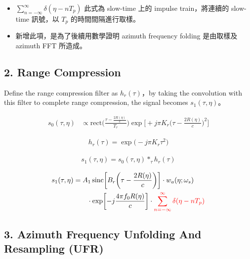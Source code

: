 \documentclass[11pt]{article}
\providecommand{\tightlist}{%
  \setlength{\itemsep}{0pt}\setlength{\parskip}{0pt}}
\begin{document}
\begin{itemize}
\tightlist
\item
  \(\sum_{n=-\infty}^{\infty}\delta(\eta-nT_p)\) 此式為 slow-time 上的
  impulse train，將連續的 slow-time 訊號，以 \(T_p\)
  的時間間隔進行取樣。
\item
  新增此項，是為了後續用數學證明 azimuth frequency folding 是由取樣及
  azimuth FFT 所造成。
\end{itemize}

\hypertarget{range-compression}{%
\subsection{2. Range Compression}\label{range-compression}}

Define the range compression filter as \(h_r(\tau)\)，by taking the convolution with this filter to complete range compression, the signal becomes \(s_1(\tau,\eta)\)。

\begin{equation}
\begin{aligned}
s_0(\tau,\eta)
&\propto
\mathrm{rect}\biggl(\frac{\tau-\frac{2R(\eta)}{c}}{T_r}\biggr)
\exp\biggl[+j\pi K_r\biggl(\tau-\frac{2R(\eta)}{c}\biggr)^2\biggr]
\end{aligned}
\end{equation}

\begin{equation}
\begin{aligned}
h_r(\tau)=\exp\bigl(-j\pi K_r\tau^2\bigr)
\end{aligned}
\end{equation}

\begin{equation}
\begin{aligned}
s_1(\tau,\eta)=s_0(\tau,\eta)*_\tau h_r(\tau)
\end{aligned}
\end{equation}

\begin{equation}
\begin{aligned}
s_1(\tau,\eta)
&=
A_1\,
\mathrm{sinc}\biggl[ B_r\biggl( \tau-\frac{2R(\eta)}{c} \biggr) \biggr]
\cdot w_a(\eta;\omega_s)\\
&\qquad \cdot \exp\biggl[ -j\frac{4\pi f_0R(\eta)}{c} \biggr]
\cdot {\color{red}{\sum_{n=-\infty}^{\infty}\delta(\eta-nT_p)}}
\end{aligned}
\end{equation}

\hypertarget{azimuth-frequency-unfolding-and-resampling-ufr}{%
\subsection{3. Azimuth Frequency Unfolding And Resampling
(UFR)}\label{azimuth-frequency-unfolding-and-resampling-ufr}}
\end{document}
